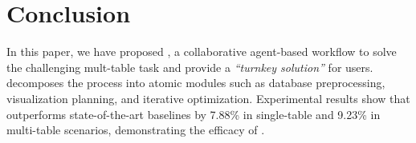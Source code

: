 \section{Conclusion}
\label{conclusion}
In this paper, we have proposed \system, a collaborative agent-based workflow to solve the challenging mult-table \nlvis task and provide a \textit{``turnkey solution''} for users. \system decomposes the process into atomic modules such as database preprocessing, visualization planning, and iterative optimization. 
Experimental results show that \system outperforms state-of-the-art baselines by 7.88\% in single-table and 9.23\% in multi-table scenarios, demonstrating the efficacy of \system.

